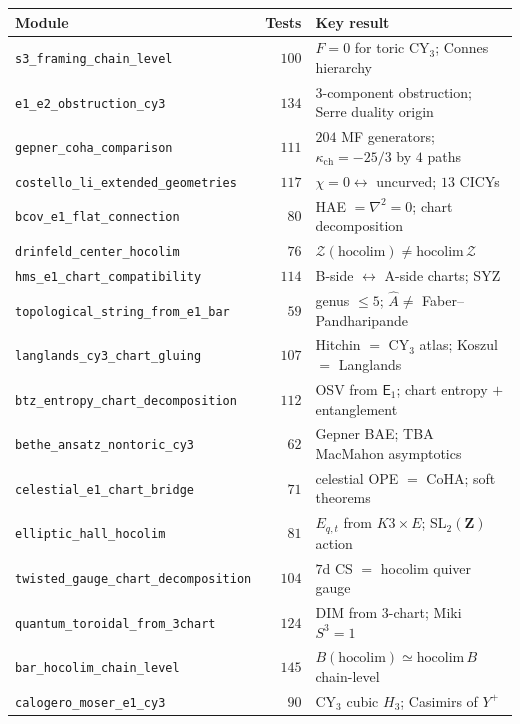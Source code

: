 \documentclass[11pt]{article}
\newcommand{\Eone}{\mathsf{E}_1}
\begin{document}
\begin{center}
\small
\renewcommand{\arraystretch}{1.2}
\begin{longtable}{lrl}
 \toprule
 \textbf{Module} & \textbf{Tests} & \textbf{Key result} \\
 \midrule
 \endhead
 \texttt{s3\_framing\_chain\_level} & $100$ & $F = 0$ for toric CY$_3$; Connes hierarchy \\
 \texttt{e1\_e2\_obstruction\_cy3} & $134$ & $3$-component obstruction; Serre duality origin \\
 \texttt{gepner\_coha\_comparison} & $111$ & $204$ MF generators; $\kappa_{\mathrm{ch}} = -25/3$ by $4$ paths \\
 \texttt{costello\_li\_extended\_geometries} & $117$ & $\chi = 0 \leftrightarrow$ uncurved; $13$ CICYs \\
 \texttt{bcov\_e1\_flat\_connection} & $80$ & HAE $= \nabla^2 = 0$; chart decomposition \\
 \texttt{drinfeld\_center\_hocolim} & $76$ & $\mathcal{Z}(\mathrm{hocolim}) \neq \mathrm{hocolim}\,\mathcal{Z}$ \\
 \texttt{hms\_e1\_chart\_compatibility} & $114$ & B-side $\leftrightarrow$ A-side charts; SYZ \\
 \texttt{topological\_string\_from\_e1\_bar} & $59$ & genus $\leq 5$; $\hat{A} \neq$ Faber--Pandharipande \\
 \texttt{langlands\_cy3\_chart\_gluing} & $107$ & Hitchin $=$ CY$_3$ atlas; Koszul $=$ Langlands \\
 \texttt{btz\_entropy\_chart\_decomposition} & $112$ & OSV from $\Eone$; chart entropy $+$ entanglement \\
 \texttt{bethe\_ansatz\_nontoric\_cy3} & $62$ & Gepner BAE; TBA MacMahon asymptotics \\
 \texttt{celestial\_e1\_chart\_bridge} & $71$ & celestial OPE $=$ CoHA; soft theorems \\
 \texttt{elliptic\_hall\_hocolim} & $81$ & $E_{q,t}$ from $K3 \times E$; SL$_2(\mathbf{Z})$ action \\
 \texttt{twisted\_gauge\_chart\_decomposition} & $104$ & $7$d CS $=$ hocolim quiver gauge \\
 \texttt{quantum\_toroidal\_from\_3chart} & $124$ & DIM from $3$-chart; Miki $S^3 = 1$ \\
 \texttt{bar\_hocolim\_chain\_level} & $145$ & $B(\mathrm{hocolim}) \simeq \mathrm{hocolim}\,B$ chain-level \\
 \texttt{calogero\_moser\_e1\_cy3} & $90$ & CY$_3$ cubic $H_3$; Casimirs of $Y^+$ \\

\end{longtable}
\end{center}
\end{document}
